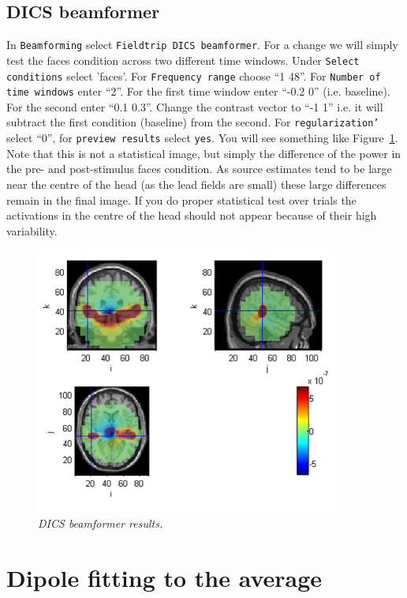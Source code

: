 \subsection{DICS beamformer}
In \texttt{Beamforming} select \texttt{Fieldtrip DICS beamformer}. For a change we will simply test the faces condition across two different time windows. Under \texttt{Select conditions} select 'faces'. For \texttt{Frequency range} choose ``1 48''. For \texttt{Number of time windows} enter ``2''. For the first time window enter ``-0.2 0'' (i.e. baseline). For the second enter ``0.1 0.3''. Change the contrast vector to ``-1 1'' i.e. it will subtract the first condition (baseline) from the second. For \texttt{regularization'} select ``0'', for \texttt{preview results} select \texttt{yes}. You will see something like Figure~\ref{meg_sloc:fig:13}. Note that this is not a statistical image, but simply the difference of the power in the pre- and post-stimulus faces condition.  As source estimates tend to be large near the centre of the head (as the lead fields are small) these large differences remain in the final image. If you do proper statistical test over trials the activations in the centre of the head should not appear because of their high variability.

\begin{figure}
\begin{center}
\includegraphics[width=100mm]{meg_sloc/slide13}
\caption{\em DICS beamformer results.\label{meg_sloc:fig:13}}
\end{center}
\end{figure}

\section{Dipole fitting to the average}

